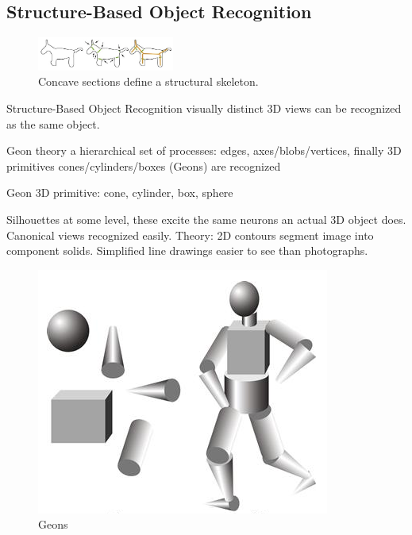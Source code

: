 \begin{mdframed}\begin{multicols}{2}
\subsection{Structure-Based Object Recognition}

    \begin{figure}[H]
        \centering
        \includegraphics[width=0.4\textwidth]{contours_donkey.png}
        \caption{Concave sections define a structural skeleton.}
    \end{figure}
\begin{compactdesc}
    \item[Structure-Based Object Recognition] visually distinct 3D views can
        be recognized as the same object.
    \item[Geon theory] a hierarchical set of processes: edges,
        axes/blobs/vertices, finally 3D primitives cones/cylinders/boxes (Geons)
        are recognized
    \item[Geon] 3D primitive: cone, cylinder, box, sphere
    \item[Silhouettes] at some level, these excite the same neurons an actual
        3D object does. Canonical views recognized easily. Theory:
        2D contours segment image into component solids. Simplified line
        drawings easier to see than photographs.

\end{compactdesc}

    \begin{figure}[H]
        \centering
        \includegraphics[width=0.6\linewidth]{geons.png}
        \caption{Geons}
    \end{figure}
\end{multicols}\end{mdframed}





